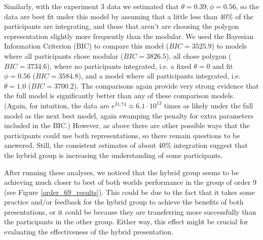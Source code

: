 \documentclass[man,mask,10pt]{apa6}
\begin{document}
Similarly, with the experiment 3 data we estimated that $\theta = 0.39, \phi = 0.56$, so the data are best fit under this model by assuming that a little less than 40\% of the participants are integrating, and those that aren't are choosing the polygon representation slightly more frequently than the modular. We used the Bayesian Information Criterion (BIC) to compare this model ($BIC = 3525.9$) to models where all participants chose modular ($BIC=3826.5$), all chose polygon ($BIC = 3734.6$), where no participants integrated, i.e. a fixed $\theta = 0$ and fit $\phi = 0.56$ ($BIC = 3584.8$), and a model where all participants integrated, i.e. $\theta = 1.0$ ($BIC = 3700.2$). The comparisons again provide very strong evidence that the full model is significantly better than any of these comparison models. (Again, for intuition, the data are $e^{31.74} \approx 6.1 \cdot 10^{13}$ times as likely under the full model as the next best model, again swamping the penalty for extra parameters included in the BIC.) However, as above there are other possible ways that the participants could use both representations, so there remain questions to be answered. Still, the consistent estimates of about 40\% integration suggest that the hybrid group is increasing the understanding of some participants.\par
After running these analyses, we noticed that the hybrid group seems to be achieving much closer to best of both worlds performance in the group of order 9 (see Figure \ref{order_69_results}). This could be due to the fact that it takes some practice and/or feedback for the hybrid group to achieve the benefits of both presentations, or it could be because they are transferring more successfully than the participants in the other group. Either way, this effect might be crucial for evaluating the effectiveness of the hybrid presentation. \par
\end{document}
